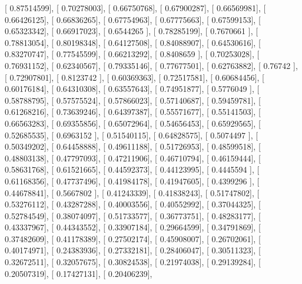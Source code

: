 \documentclass{article}
\begin{document}
       [ 0.87514599],
       [ 0.70278003],
       [ 0.66750768],
       [ 0.67900287],
       [ 0.66569981],
       [ 0.66426125],
       [ 0.66836265],
       [ 0.67754963],
       [ 0.67775663],
       [ 0.67599153],
       [ 0.65323342],
       [ 0.66917023],
       [ 0.6544265 ],
       [ 0.78285199],
       [ 0.7670661 ],
       [ 0.78813054],
       [ 0.80198348],
       [ 0.64127508],
       [ 0.84088907],
       [ 0.64530616],
       [ 0.83270747],
       [ 0.77545599],
       [ 0.66213292],
       [ 0.8408659 ],
       [ 0.70253028],
       [ 0.76931152],
       [ 0.62340567],
       [ 0.79335146],
       [ 0.77677501],
       [ 0.62763882],
       [ 0.76742   ],
       [ 0.72907801],
       [ 0.8123742 ],
       [ 0.60369363],
       [ 0.72517581],
       [ 0.60684456],
       [ 0.60176184],
       [ 0.64310308],
       [ 0.63557643],
       [ 0.74951877],
       [ 0.5776049 ],
       [ 0.58788795],
       [ 0.57575524],
       [ 0.57866023],
       [ 0.57140687],
       [ 0.59459781],
       [ 0.61268216],
       [ 0.73639246],
       [ 0.64397387],
       [ 0.55571677],
       [ 0.55141503],
       [ 0.66563283],
       [ 0.69355856],
       [ 0.65072964],
       [ 0.54656453],
       [ 0.65929565],
       [ 0.52685535],
       [ 0.6963152 ],
       [ 0.51540115],
       [ 0.64828575],
       [ 0.5074497 ],
       [ 0.50349202],
       [ 0.64458888],
       [ 0.49611188],
       [ 0.51726953],
       [ 0.48599518],
       [ 0.48803138],
       [ 0.47797093],
       [ 0.47211906],
       [ 0.46710794],
       [ 0.46159444],
       [ 0.58631768],
       [ 0.61521665],
       [ 0.44592373],
       [ 0.44123995],
       [ 0.4445594 ],
       [ 0.61168356],
       [ 0.47737496],
       [ 0.41984178],
       [ 0.41947605],
       [ 0.4399296 ],
       [ 0.44678841],
       [ 0.5667802 ],
       [ 0.41243339],
       [ 0.41838243],
       [ 0.51747802],
       [ 0.53276112],
       [ 0.43287288],
       [ 0.40003556],
       [ 0.40552992],
       [ 0.37044325],
       [ 0.52784549],
       [ 0.38074097],
       [ 0.51733577],
       [ 0.36773751],
       [ 0.48283177],
       [ 0.43337967],
       [ 0.44343552],
       [ 0.33907184],
       [ 0.29664599],
       [ 0.34791869],
       [ 0.37482609],
       [ 0.41178389],
       [ 0.27502174],
       [ 0.45908007],
       [ 0.26702061],
       [ 0.40174971],
       [ 0.24383936],
       [ 0.27332181],
       [ 0.28406047],
       [ 0.30511323],
       [ 0.32672511],
       [ 0.32057675],
       [ 0.30824538],
       [ 0.21974038],
       [ 0.29139284],
       [ 0.20507319],
       [ 0.17427131],
       [ 0.20406239],
\end{document}
